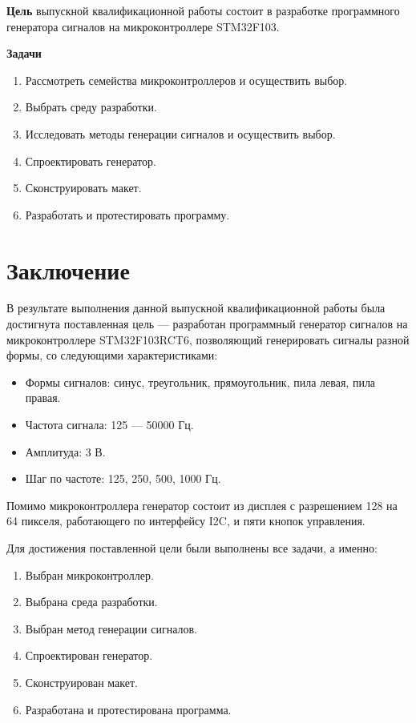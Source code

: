 \documentclass[14pt, oneside]{altsu-bachelor}
\begin{document}
\textbf{Цель}
выпускной квалификационной работы состоит в разработке программного генератора сигналов на микроконтроллере STM32F103.

\textbf{Задачи}

\begin{enumerate}
\item Рассмотреть семейства микроконтроллеров и осуществить выбор.
\item Выбрать среду разработки.
\item Исследовать методы генерации сигналов и осуществить выбор.
\item Спроектировать генератор.
\item Сконструировать макет.
\item Разработать и протестировать программу.
\end{enumerate}





\chapter*{Заключение}
В результате выполнения данной выпускной квалификационной работы была достигнута поставленная цель --- разработан программный генератор сигналов на микроконтроллере STM32F103RCT6, позволяющий генерировать сигналы разной формы, со следующими характеристиками:

\begin{itemize}
	\item Формы сигналов: синус, треугольник, прямоугольник, пила левая, пила правая.
	\item Частота сигнала: 125 --- 50000 Гц.
	\item Амплитуда: 3 В.
	\item Шаг по частоте: 125, 250, 500, 1000 Гц.
\end{itemize}

Помимо микроконтроллера генератор состоит из дисплея с разрешением 128 на 64 пикселя, работающего по интерфейсу I2C, и пяти кнопок управления.

Для достижения поставленной цели были выполнены все задачи, а именно:
\begin{enumerate}
	\item Выбран микроконтроллер.
	\item Выбрана среда разработки.
	\item Выбран метод генерации сигналов.
	\item Спроектирован генератор.
	\item Сконструирован макет.
	\item Разработана и протестирована программа.
\end{enumerate}
\end{document}
